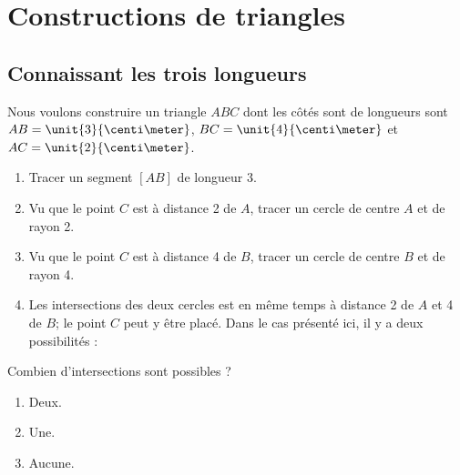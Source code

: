 


\section{Constructions de triangles}

\subsection{Connaissant les trois longueurs}

Nous voulons construire un triangle \(ABC\) dont les côtés sont de longueurs sont \( AB=\unit{3}{\centi\meter}\), \( BC=\unit{4}{\centi\meter}\) et \( AC=\unit{2}{\centi\meter}\).


\begin{enumerate}
    \item
        Tracer un segment \( [AB]\) de longueur \unit{3}{\centi\meter}.
\begin{center}
   
\end{center}
    \item
        Vu que le point \( C\) est à distance \unit{2}{\centi\meter} de \( A\), tracer un cercle de centre \( A\) et de rayon \unit{2}{\centi\meter}.
    \item
        Vu que le point \( C\) est à distance \unit{4}{\centi\meter} de \( B\), tracer un cercle de centre \( B\) et de rayon \unit{4}{\centi\meter}.
\begin{center}
   
\end{center}
    \item
        Les intersections des deux cercles est en même temps à distance \unit{2}{\centi\meter} de \( A\) et \unit{4}{\centi\meter} de \( B\); le point \( C\) peut y être placé. Dans le cas présenté ici, il y a deux possibilités :

\begin{center}
   
\end{center}

\end{enumerate}

Combien d'intersections sont possibles ?
\begin{enumerate}
    \item
        Deux.
    \item
        Une.
    \item 
        Aucune.
\end{enumerate}
